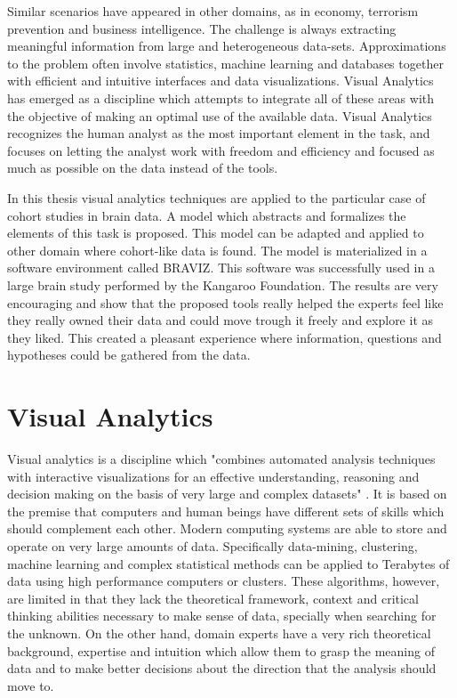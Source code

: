 Similar scenarios have appeared in other domains, as in economy, terrorism prevention and business intelligence. The challenge is always extracting meaningful information from large and heterogeneous data-sets. Approximations to the problem often involve statistics, machine learning and databases together with efficient and intuitive interfaces and data visualizations. Visual Analytics has emerged as a discipline which attempts to integrate all of these areas with the objective of making an optimal use of the available data. Visual Analytics recognizes the human analyst as the most important element in the task, and focuses on letting the analyst work with freedom and efficiency and focused as much as possible on the data instead of the tools.

In this thesis visual analytics techniques are applied to the particular case of cohort studies in brain data. A model which abstracts and formalizes the elements of this task is proposed. This model can be adapted and applied to other domain where cohort-like data is found. The model is materialized in a software environment called BRAVIZ. This software was successfully used in a large brain study performed by the Kangaroo Foundation. The results are very encouraging and show that the proposed tools really helped the experts feel like they really owned their data and could move trough it freely and explore it as they liked. This created a pleasant experience where information, questions and hypotheses could be gathered from the data.


\section{Visual Analytics}


Visual analytics is a discipline which "combines automated analysis techniques with interactive
visualizations for an effective understanding, reasoning and decision making on the basis of very
large and complex datasets" \autocite{cook_illuminating_2005}. It is based on the premise that computers and
human beings have different sets of skills which should complement each other. Modern
computing systems are able to store and operate on very large amounts of data.
Specifically data-mining, clustering, machine learning and complex statistical methods can be
applied to Terabytes of data using high performance computers or clusters. These
algorithms, however, are limited in that they lack the theoretical framework, context and critical
thinking abilities necessary to make sense of data, specially when searching for the unknown. 
On the other hand, domain experts have a very rich theoretical
background, expertise and intuition which allow them to grasp the meaning of data and to
make better decisions about the direction that the analysis should move to. 

